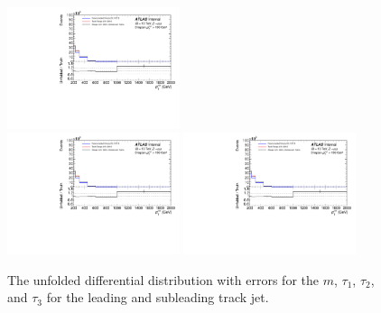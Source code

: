 \begin{figure}[h!]
  \includegraphics[page=329,width=0.45\textwidth]{figures/IBUPlots.pdf} \\
  \includegraphics[page=245,width=0.45\textwidth]{figures/IBUPlots.pdf}
  \includegraphics[page=343,width=0.45\textwidth]{figures/IBUPlots.pdf}
  \caption{The unfolded differential distribution with errors for the $m$, $\tau_1$, $\tau_2$, and $\tau_3$ for the leading and subleading track jet.}
  \label{fig:unfoldErr3}
\end{figure}
